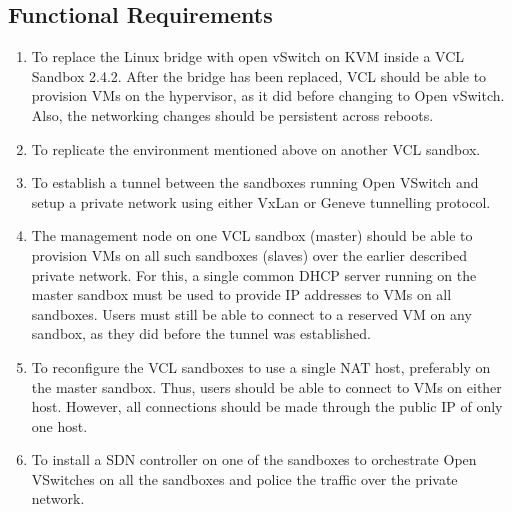 \documentclass{article}
\begin{document}
\subsection{Functional Requirements}
\begin{enumerate}
    \item To replace the Linux bridge with open vSwitch on KVM inside a VCL Sandbox 2.4.2. After the bridge has been replaced, VCL should be able to provision VMs on the hypervisor, as it did before changing to Open vSwitch. Also, the networking changes should be persistent across reboots.

    \item To replicate the environment mentioned above on another VCL sandbox. 
    
    \item To establish a tunnel between the sandboxes running Open VSwitch and setup a private network using either VxLan or Geneve tunnelling protocol.

    \item The management node on one VCL sandbox (master) should be able to provision VMs on all such sandboxes (slaves) over the earlier described private network. For this, a single common DHCP server running on the master sandbox must be used to provide IP addresses to VMs on all sandboxes. Users must still be able to connect to a reserved VM on any sandbox, as they did before the tunnel was established.
    
    \item To reconfigure the VCL sandboxes to use a single NAT host, preferably on the master sandbox. Thus, users should be able to connect to VMs on either host. However, all connections should be made through the public IP of only one host.

    
    
    

        
    \item To install a SDN controller on one of the sandboxes to orchestrate Open VSwitches on all the sandboxes and police the traffic over the private network.
    
\end{enumerate}
\end{document}
